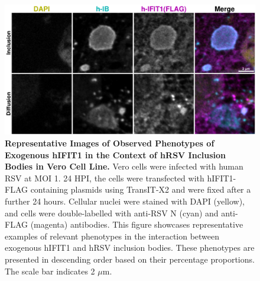 \begin{figure}
    \centering
    \includegraphics[width=1\linewidth]{09. Chapter 4/Figs/02. Overexpression/01. IFIT1/03. i1-hrsv.pdf}
    \caption[Representative Images of Observed Phenotypes of Exogenous hIFIT1 in the Context of hRSV Inclusion Bodies in Vero Cell Line.]{\textbf{Representative Images of Observed Phenotypes of Exogenous hIFIT1 in the Context of hRSV Inclusion Bodies in Vero Cell Line.} Vero cells were infected with human RSV at MOI 1. 24 HPI, the cells were transfected with hIFIT1-FLAG containing plasmids using TransIT-X2 and were fixed after a further 24 hours. Cellular nuclei were stained with DAPI (yellow), and cells were double-labelled with anti-RSV N (cyan) and anti-FLAG (magenta) antibodies. This figure showcases representative examples of relevant phenotypes in the interaction between exogenous hIFIT1 and hRSV inclusion bodies. These phenotypes are presented in descending order based on their percentage proportions. The scale bar indicates 2 \(\mu \mbox{m}\).}
    \label{fig:Representative Images of Observed Phenotypes of Exogenous hIFIT1 in the Context of hRSV Inclusion Bodies in VERO Cell Line}
\end{figure}

